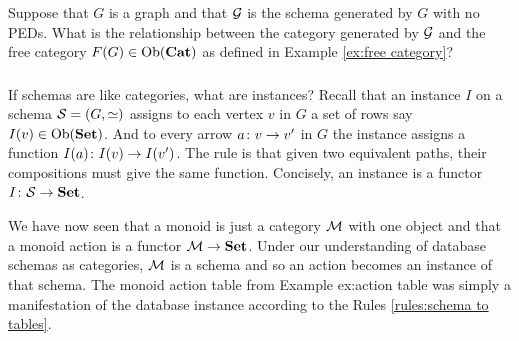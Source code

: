 \documentclass[CT4S-EN-RU]{subfiles}
\begin{document}
\begin{exerciseRUS}
\end{exerciseRUS}

\begin{exerciseENG}
Suppose that $G$ is a graph and that $\mathcal{G}$ is the schema generated by $G$ with no PEDs. What is the relationship between the category generated by $\mathcal{G}$ and the free category $F(G)\in\textnormal{Ob}({\bf Cat})$ as defined in Example \ref{ex:free category}?
\end{exerciseENG}

\begin{exerciseRUS}
\end{exerciseRUS}


\subsubsection{}\label{sec:instances}

\begin{blockENG}
If schemas are like categories, what are instances? Recall that an instance $I$ on a schema $\mathcal{S}=(G,\simeq)$ assigns to each vertex $v$ in $G$ a set of rows say $I(v)\in\textnormal{Ob}({\bf Set})$. And to every arrow $a\colon v\rightarrow v'$ in $G$ the instance assigns a function $I(a)\colon I(v)\rightarrow I(v')$. The rule is that given two equivalent paths, their compositions must give the same function. Concisely, an instance is a functor $I\colon\mathcal{S}\rightarrow{\bf Set}$. 
\end{blockENG}

\begin{blockRUS}
\end{blockRUS}

\begin{exampleENG}
We have now seen that a monoid is just a category $\mathcal{M}$ with one object and that a monoid action is a functor $\mathcal{M}\rightarrow{\bf Set}$. Under our understanding of database schemas as categories, $\mathcal{M}$ is a schema and so an action becomes an instance of that schema. The monoid action table from Example {ex:action table} was simply a manifestation of the database instance according to the Rules \ref{rules:schema to tables}.
\end{exampleENG}

\begin{exampleRUS}
\end{exampleRUS}
\end{document}
